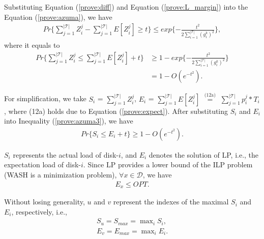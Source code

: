 \documentclass[conference]{IEEEtran}
\begin{document}
\vspace{-0.1cm}
Substituting Equation (\ref{prove:diff}) and Equation (\ref{prove:L_margin}) into the  Equation (\ref{prove:azuma}), we have  
\vspace{-0.2cm}
\begin{align}
Pr\{\sum\nolimits_{j = 1}^{|\mathcal{T}|} Z_i^j - 
	\sum\nolimits_{j = 1}^{|\mathcal{T}|} E[Z_i^j]\geq t\} \leq exp\{-\frac{t^2}{2\sum_{ i = 1 }^{|\mathcal{T}|}(g_i^k)^2}\},\nonumber
\end{align}
 \vspace{-0.2cm}
 where it equals to
\begin{align}
Pr\{\sum_{j = 1}^{|\mathcal{T}|} Z_i^j \leq \sum_{j = 1}^{|\mathcal{T}|} E[Z_i^j] + t\} & \geq 1 - exp\{-\frac{t^2}{2\sum_{ i = 1 }^{|\mathcal{T}|}(g_i^k)^2}\}\nonumber\\
& = 1 - O(e^{-t^2}).\label{prove:azuma3}
\end{align}

\vspace{-0.2cm}
For simplification, we take $S_i$  = $\sum_{j = 1}^{|\mathcal{T}|} Z_i^j$,
$E_i$ = $\sum_{j = 1}^{|\mathcal{T}|} E[Z_i^j]$
$\overset{\text{(12a)}}{=}$
$\sum_{j = 1}^{|\mathcal{T}|} p_i^j*T_i$, where (12a) holds due to Equation (\ref{prove:expect}). After substituting $S_i$ and $E_i$ into Inequality (\ref{prove:azuma3}), we have
\vspace{-0.2cm}
\begin{align}
Pr\{S_i \leq E_i + t\} \geq 1- O(e^{-t^2}). \label{prove:SU}
\end{align}

\vspace{-0.2cm}
$S_i$ represents the actual load of disk-$i$, and $E_i$ denotes the solution of LP, i.e., the expectation load of disk-$i$. Since LP provides a lower bound of the ILP problem (WASH is a minimization problem), $\forall x \in \mathcal{D}$, we have
\vspace{-0.2cm}
\begin{align}
E_x \leq OPT.\label{prove:OPT}
\end{align}

\vspace{-0.2cm}
Without losing generality, $u$ and $v$ represent the indexes of the maximal $S_i$ and $E_i$, respectively, i.e.,
\vspace{-0.2cm}
\begin{align}
	S_u = S_{max} = \max\nolimits_i S_i,\\
	E_v = E_{max} = \max\nolimits_i E_i.\label{prove:Emax}
\end{align}
\end{document}
